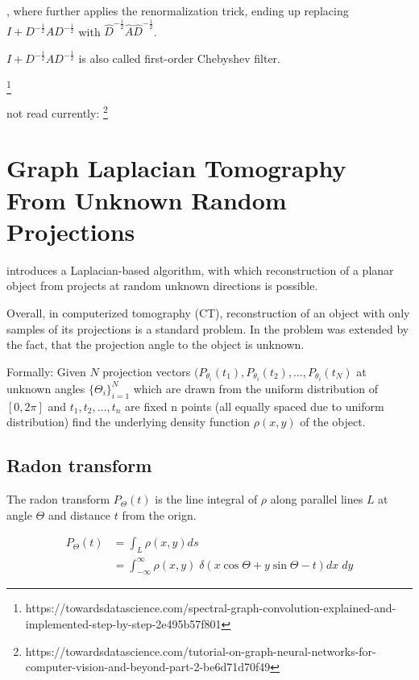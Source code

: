 , where \citet{GCN} further applies the renormalization trick, ending up replacing
$I + D^{-\frac{1}{2}} A D^{-\frac{1}{2}}$ with $\hat{D}^{-\frac{1}{2}} \hat{A} \hat{D}^{-\frac{1}{2}}$.

$I + D^{-\frac{1}{2}} A D^{-\frac{1}{2}}$ is also called first-order Chebyshev filter.

\footnote{https://towardsdatascience.com/spectral-graph-convolution-explained-and-implemented-step-by-step-2e495b57f801}

not read currently:
\footnote{https://towardsdatascience.com/tutorial-on-graph-neural-networks-for-computer-vision-and-beyond-part-2-be6d71d70f49}


\section{Graph Laplacian Tomography From Unknown Random Projections}

\citet{LaplaceRandomProjections} introduces a Laplacian-based algorithm, with which 
reconstruction of a planar object from projects at random unknown directions is possible.

Overall, in computerized tomography (CT), reconstruction of an object with only samples of its projections
is a standard problem. In \citet{LaplaceRandomProjections} the problem was extended by the fact,
that the projection angle to the object is unknown.

Formally:
Given $N$ projection vectors $( P_{\theta_i}(t_1), P_{\theta_i}(t_2), \dots, P_{\theta_i}(t_N)$ 
at unknown angles $\{\Theta_i\}^N_{i=1}$ which are drawn from the uniform distribution of $[0, 2\pi]$
and $t_1, t_2, \dots, t_n$ are fixed n points (all equally spaced due to uniform distribution) 
find the underlying density function $\rho (x,y)$ of the object.

\subsection{Radon transform}

The radon transform $P_{\Theta}(t)$ is the line integral of $\rho$
along parallel lines $L$ at angle $\Theta$ and distance $t$ from the orign.

\begin{equation}
    \begin{aligned}
        P_{\Theta}(t) &= \int_L \rho (x,y) ds \\
                      &=  \int_{-\infty}^{\infty} \rho (x,y) \; \delta(x \cos \Theta + y \sin \Theta - t) dx \; dy
    \end{aligned}
\end{equation}


